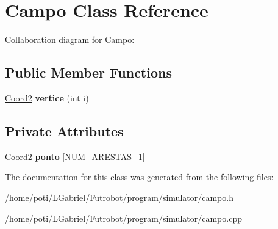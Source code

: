 \hypertarget{classCampo}{}\section{Campo Class Reference}
\label{classCampo}


Collaboration diagram for Campo\+:
\subsection*{Public Member Functions}
\begin{DoxyCompactItemize}
\item 
\hyperlink{structCoord2}{Coord2} {\bfseries vertice} (int i)\hypertarget{classCampo_a040007cb03214d7bab7cae8e8a8be444}{}\label{classCampo_a040007cb03214d7bab7cae8e8a8be444}

\end{DoxyCompactItemize}
\subsection*{Private Attributes}
\begin{DoxyCompactItemize}
\item 
\hyperlink{structCoord2}{Coord2} {\bfseries ponto} \mbox{[}N\+U\+M\+\_\+\+A\+R\+E\+S\+T\+AS+1\mbox{]}\hypertarget{classCampo_ac3cb529bd44b9ddca0312c80e92c2d3c}{}\label{classCampo_ac3cb529bd44b9ddca0312c80e92c2d3c}

\end{DoxyCompactItemize}


The documentation for this class was generated from the following files\+:\begin{DoxyCompactItemize}
\item 
/home/poti/\+L\+Gabriel/\+Futrobot/program/simulator/campo.\+h\item 
/home/poti/\+L\+Gabriel/\+Futrobot/program/simulator/campo.\+cpp\end{DoxyCompactItemize}
